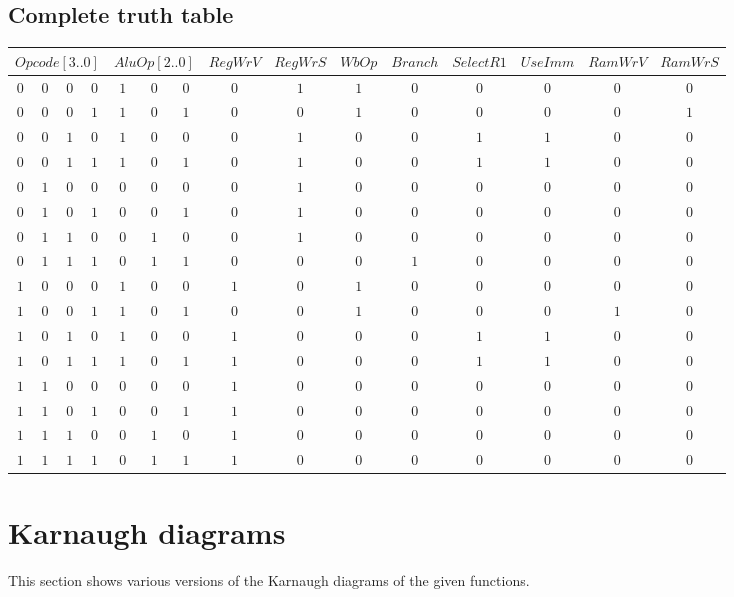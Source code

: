 \documentclass [15pt,a4paper,twoside]{article}
\begin{document}
\subsection{Complete truth table}
\begin{center}
\begin{tabular}{cccc|ccccccccccc}
\multicolumn{4}{c|}{$Opcode[3..0]$}&\multicolumn{3}{c}{$AluOp[2..0]$}&$RegWrV$&$RegWrS$&$WbOp$&$Branch$&$SelectR1$&$UseImm$&$RamWrV$&$RamWrS$\\
\hline
$0$&$0$&$0$&$0$&$1$&$0$&$0$&$0$&$1$&$1$&$0$&$0$&$0$&$0$&$0$\\
$0$&$0$&$0$&$1$&$1$&$0$&$1$&$0$&$0$&$1$&$0$&$0$&$0$&$0$&$1$\\
$0$&$0$&$1$&$0$&$1$&$0$&$0$&$0$&$1$&$0$&$0$&$1$&$1$&$0$&$0$\\
$0$&$0$&$1$&$1$&$1$&$0$&$1$&$0$&$1$&$0$&$0$&$1$&$1$&$0$&$0$\\
$0$&$1$&$0$&$0$&$0$&$0$&$0$&$0$&$1$&$0$&$0$&$0$&$0$&$0$&$0$\\
$0$&$1$&$0$&$1$&$0$&$0$&$1$&$0$&$1$&$0$&$0$&$0$&$0$&$0$&$0$\\
$0$&$1$&$1$&$0$&$0$&$1$&$0$&$0$&$1$&$0$&$0$&$0$&$0$&$0$&$0$\\
$0$&$1$&$1$&$1$&$0$&$1$&$1$&$0$&$0$&$0$&$1$&$0$&$0$&$0$&$0$\\
$1$&$0$&$0$&$0$&$1$&$0$&$0$&$1$&$0$&$1$&$0$&$0$&$0$&$0$&$0$\\
$1$&$0$&$0$&$1$&$1$&$0$&$1$&$0$&$0$&$1$&$0$&$0$&$0$&$1$&$0$\\
$1$&$0$&$1$&$0$&$1$&$0$&$0$&$1$&$0$&$0$&$0$&$1$&$1$&$0$&$0$\\
$1$&$0$&$1$&$1$&$1$&$0$&$1$&$1$&$0$&$0$&$0$&$1$&$1$&$0$&$0$\\
$1$&$1$&$0$&$0$&$0$&$0$&$0$&$1$&$0$&$0$&$0$&$0$&$0$&$0$&$0$\\
$1$&$1$&$0$&$1$&$0$&$0$&$1$&$1$&$0$&$0$&$0$&$0$&$0$&$0$&$0$\\
$1$&$1$&$1$&$0$&$0$&$1$&$0$&$1$&$0$&$0$&$0$&$0$&$0$&$0$&$0$\\
$1$&$1$&$1$&$1$&$0$&$1$&$1$&$1$&$0$&$0$&$0$&$0$&$0$&$0$&$0$\\

\end{tabular}
\end{center}
\section{Karnaugh diagrams}
This section shows various versions of the Karnaugh diagrams of the given functions.
\end{document}
